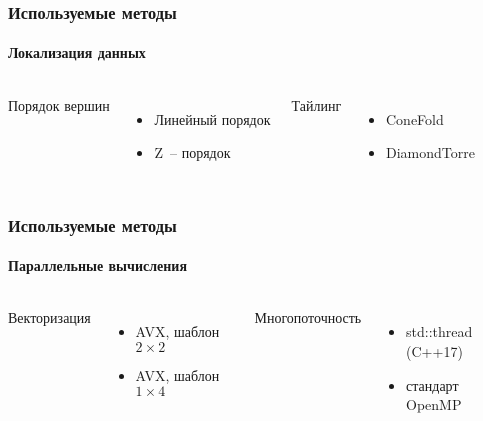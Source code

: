 \documentclass[presentation,18pt]{beamer}
\begin{document}
\begin{frame}[t]
	\label{methods-local}
	\frametitle{Используемые методы}
	\framesubtitle{Локализация данных}

	\begin{columns}

		\begin{alertblock}{Порядок вершин}
			\vspace{120pt}
		\end{alertblock}

		\begin{itemize}
			\item Линейный порядок
			\item Z~-- порядок
		\end{itemize}


		\begin{alertblock}{Тайлинг}
			\vspace{120pt}
		\end{alertblock}

		\begin{itemize}
			\item ConeFold
			\item DiamondTorre
		\end{itemize}

	\end{columns}
\end{frame}

\begin{frame}[t]
	\label{methods-parallel}
	\frametitle{Используемые методы}
	\framesubtitle{Параллельные вычисления}

	\begin{columns}

	\column{0.4\textwidth}
		\begin{alertblock}{Векторизация}
			\vspace{120pt}
		\end{alertblock}

		\begin{itemize}
			\item AVX, шаблон $2 \times 2$
			\item AVX, шаблон $1 \times 4$
		\end{itemize}

	\column{0.1\textwidth}

	\column{0.4\textwidth}
		\begin{alertblock}{Многопоточность}
			\vspace{120pt}
		\end{alertblock}

		\begin{itemize}
			\item std::thread (C++17)
			\item стандарт OpenMP
		\end{itemize}

	\end{columns}
\end{frame}
\end{document}
